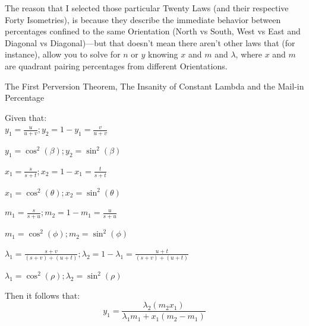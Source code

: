 The reason that I selected those particular Twenty Laws (and their respective Forty Isometries), is because they describe the immediate behavior between percentages confined to the same Orientation (North vs South, West vs East and Diagonal vs Diagonal)---but that doesn't mean there aren't other laws that (for instance), allow you to solve for $n$ or $y$ knowing $x$ and $m$ and $\lambda$, where $x$ and $m$ are quadrant pairing percentages from different Orientations.
\newpage
\begin{theorem}{The First Perversion Theorem, The Insanity of Constant Lambda and the Mail-in Percentage}

Given that:\\
$y_{1}=\frac{u}{u+v};y_{2}=1-y_{1}=\frac{v}{u+v}$

$y_{1}=\cos^{2}(\beta); y_{2}=\sin^{2}(\beta)$

$x_{1}=\frac{s}{s+t};x_{2}=1-x_{1}=\frac{t}{s+t}$

$x_{1}=\cos^{2}(\theta); x_{2}=\sin^{2}(\theta)$

$m_{1}=\frac{s}{s+u};m_{2}=1-m_{1}=\frac{u}{s+u}$

$m_{1}=\cos^{2}(\phi); m_{2}=\sin^{2}(\phi)$

$\lambda_{1}=\frac{s+v}{(s+v)+(u+t)};\lambda_{2}=1-\lambda_{1}=\frac{u+t}{(s+v)+(u+t)}$

$\lambda_{1}=\cos^{2}(\rho); \lambda_{2}=\sin^{2}(\rho)$

Then it follows that:
$$y_{1}=\frac{\lambda_{2}(m_{2}x_{1})}{\lambda_{1}m_{1}+x_{1}(m_{2}-m_{1})}$$


\end{theorem}
